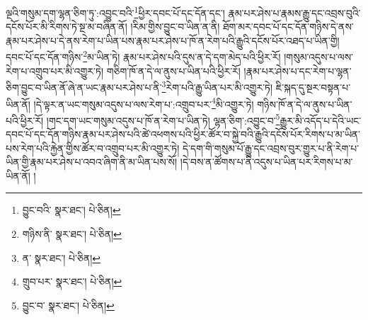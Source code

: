 ལྔའི་གསུམ་དག་ལྷན་ཅིག་ཏུ་:འབྱུང་བའི་\footnote{བྱུང་བའི་  སྣར་ཐང་།  པེ་ཅིན། }ཕྱིར་དབང་པོ་དང་དོན་དང་། རྣམ་པར་ཤེས་པ་རྣམས་རྒྱུ་དང་འབྲས་བུའི་དངོས་པོར་མི་རིགས་ཏེ་སྔ་མ་བཞིན་ནོ། །རིམ་གྱིས་བྱུང་བ་ཡིན་ན་ནི། ཐོག་མར་དབང་པོ་དང་དོན་གཉིས་དེ་ནས་རྣམ་པར་ཤེས་པ་དེ་ནས་རེག་པ་ཡིན་པས་རྣམ་པར་ཤེས་པ་ཁོ་ན་རེག་པའི་རྒྱུའི་དངོས་པོར་འཐད་པ་ཡིན་གྱི། དབང་པོ་དང་དོན་གཉིས་\footnote{གཉིས་ནི་  སྣར་ཐང་།  པེ་ཅིན། }མ་ཡིན་ཏེ། རྣམ་པར་ཤེས་པའི་དུས་ན་དེ་དག་མེད་པའི་ཕྱིར་རོ། །གསུམ་འདུས་པ་ལས་རེག་པ་འགྲུབ་པར་མི་འགྱུར་ཏེ། གཅིག་ཁོ་ན་དེ་ལ་ནུས་པ་ཡིན་པའི་ཕྱིར་རོ། །རྣམ་པར་ཤེས་པ་དང་རེག་པ་ལྷན་ཅིག་བྱུང་བ་ཡིན་ནོ་ཞེ་ན་ཡང་རྣམ་པར་ཤེས་པ་ནི་\footnote{ན་  སྣར་ཐང་།  པེ་ཅིན། }རེག་པའི་རྒྱུ་ཡིན་པར་མི་འགྱུར་ཏེ། ཇི་སྐད་དུ་སྔར་བསྟན་པ་ཡིན་ནོ། །དེ་ལྟར་ན་ཡང་གསུམ་འདུས་པ་ལས་རེག་པ་:འགྲུབ་པར་\footnote{གྲུབ་པར་  སྣར་ཐང་།  པེ་ཅིན། }མི་འགྱུར་ཏེ། གཉིས་ཁོ་ན་དེ་ལ་ནུས་པ་ཡིན་པའི་ཕྱིར་རོ། །གང་དག་ཡང་གསུམ་འདུས་པ་ཁོ་ན་རེག་པ་ཡིན་ཏེ། ལྷན་ཅིག་:འབྱུང་བ་\footnote{བྱུང་བ་  སྣར་ཐང་།  པེ་ཅིན། }རྒྱུར་མི་འདོད་པ་དེའི་ཡང་དབང་པོ་དང་དོན་གཉིས་རྣམ་པར་ཤེས་པའི་ཚེ་འཕགས་པའི་ཕྱིར་ཚོར་བ་སྐྱེ་བའི་རྒྱུའི་དངོས་པོར་རིགས་པ་མ་ཡིན་པས་རེག་པའི་རྐྱེན་གྱིས་ཚོར་བ་འགྲུབ་པར་མི་འགྱུར་ཏེ། དེ་དག་གི་གསུམ་པོ་རྒྱུ་དང་འབྲས་བུར་གྱུར་པ་ནི་རེག་པ་ཡིན་གྱི་རྣམ་པར་ཤེས་པ་འབའ་ཞིག་ནི་མ་ཡིན་པས་སོ། །དེ་བས་ན་ཚོགས་པ་ནི་འདུས་པ་ཡིན་པར་རིགས་པ་མ་ཡིན་ནོ། །
